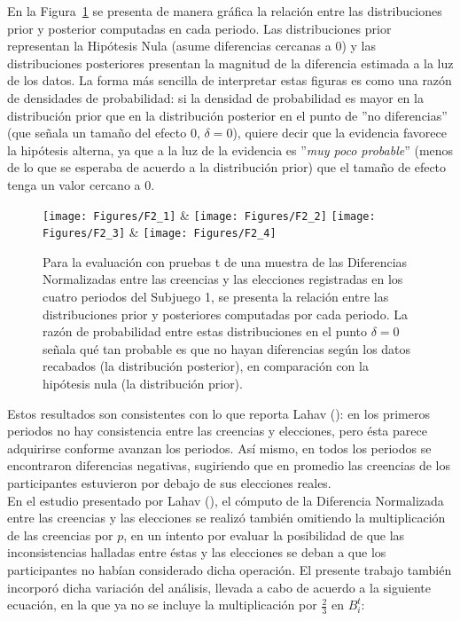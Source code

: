 En la Figura~\ref{fig:DN_S1} se presenta de manera gráfica la relación entre las distribuciones prior y posterior computadas en cada periodo. Las distribuciones prior representan la Hipótesis Nula (asume diferencias  cercanas a 0) y las distribuciones posteriores presentan la magnitud de la diferencia estimada a la luz de los datos. La forma más sencilla de interpretar estas figuras es como una razón de densidades de probabilidad: si la densidad de probabilidad es mayor en la distribución prior que en la distribución posterior en el punto de ''no diferencias'' (que señala un tamaño del efecto 0, $\delta = 0$), quiere decir que la evidencia favorece la hipótesis alterna, ya que a la luz de la evidencia es ''\textit{muy poco probable}'' (menos de lo que se esperaba de acuerdo a la distribución prior) que el tamaño de efecto tenga un valor cercano a 0.\\
  
\begin{figure}[hp]
\centering
\texttt{[image: Figures/F2\_1]} & \texttt{[image: Figures/F2\_2]} 
\texttt{[image: Figures/F2\_3]} & \texttt{[image: Figures/F2\_4]} 
\decoRule
\caption[Diferencias Normalizadas entre creencias y elecciones en el Subjuegoo 1 (Factor de Bayes)]{Para la evaluación con pruebas t de una muestra de las Diferencias Normalizadas entre las creencias y las elecciones registradas en los cuatro periodos del Subjuego 1, se presenta la relación entre las distribuciones prior y posteriores computadas por cada periodo. La razón de probabilidad entre estas distribuciones en el punto $\delta = 0$ señala qué tan probable es que no hayan diferencias según los datos recabados (la distribución posterior), en comparación con la hipótesis nula (la distribución prior).}
\label{fig:DN_S1}
\end{figure}

Estos resultados son consistentes con lo que reporta Lahav (\citeyear{Lahav}): en los primeros periodos no hay consistencia entre las creencias y elecciones, pero ésta parece adquirirse conforme avanzan los periodos. Así mismo, en todos los periodos se encontraron diferencias negativas, sugiriendo que en promedio las creencias de los participantes estuvieron por debajo de sus elecciones reales.\\

En el estudio presentado por Lahav (\citeyear{Lahav}), el cómputo de la Diferencia Normalizada entre las creencias y las elecciones se realizó también omitiendo la multiplicación de las creencias por $p$, en un intento por evaluar la posibilidad de que las inconsistencias halladas entre éstas y las elecciones se deban a que los participantes no habían considerado dicha operación. El presente trabajo también incorporó dicha variación del análisis, llevada a cabo de acuerdo a la siguiente ecuación, en la que ya no se incluye la multiplicación por $\frac{2}{3}$ en $B_i^t$:\\

